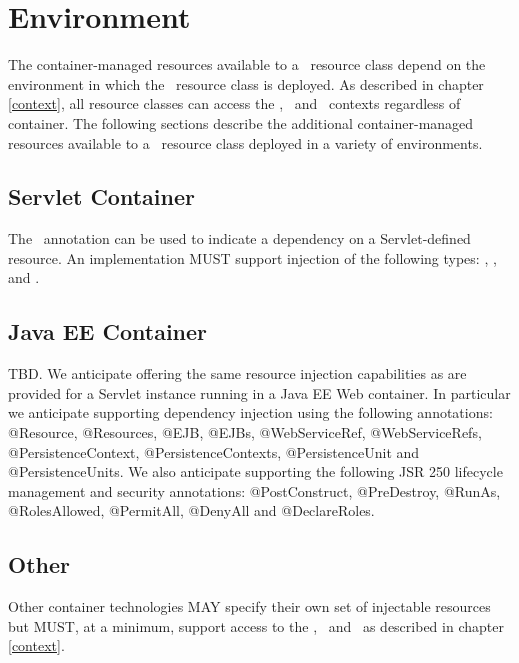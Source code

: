 \chapter{Environment}

The container-managed resources available to a \jaxrs\ resource class depend on the environment in which the \jaxrs\ resource class is deployed. As described in chapter \ref{context}, all resource classes can access the \UriInfo, \HttpHeaders\ and \PreconditionEvaluator\ contexts regardless of container. The following sections describe the additional container-managed resources available to a \jaxrs\ resource class deployed in a variety of environments.

\section{Servlet Container}

The \Resource\ annotation can be used to indicate a dependency on a Servlet-defined resource. An implementation MUST support injection of the following types: , ,  and .

\section{Java EE Container}

\begin{ednote*}
TBD. We anticipate offering the same resource injection capabilities as are provided for a Servlet instance running in a Java EE Web container. In particular we anticipate supporting dependency injection using the following annotations: @Resource, @Resources, @EJB, @EJBs, @WebServiceRef, @WebServiceRefs, @PersistenceContext, @PersistenceContexts, @PersistenceUnit and @PersistenceUnits. We also anticipate supporting the following JSR 250 lifecycle management and security annotations:  @PostConstruct, @PreDestroy, @RunAs, @RolesAllowed, @PermitAll, @DenyAll and @DeclareRoles.
\end{ednote*}

\section{Other}

Other container technologies MAY specify their own set of injectable resources but MUST, at a minimum, support access to the \UriInfo, \HttpHeaders\ and \PreconditionEvaluator\ as described in chapter \ref{context}.